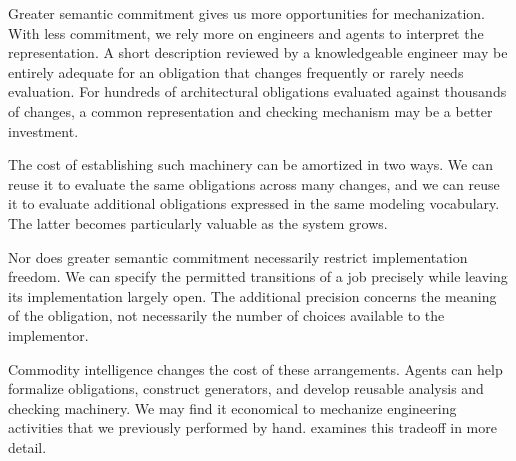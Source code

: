 Greater semantic commitment gives us more opportunities for mechanization. With less commitment, we rely more on engineers and agents to interpret the representation. A short description reviewed by a knowledgeable engineer may be entirely adequate for an obligation that changes frequently or rarely needs evaluation. For hundreds of architectural obligations evaluated against thousands of changes, a common representation and checking mechanism may be a better investment.

The cost of establishing such machinery can be amortized in two ways. We can reuse it to evaluate the same obligations across many changes, and we can reuse it to evaluate additional obligations expressed in the same modeling vocabulary. The latter becomes particularly valuable as the system grows.

Nor does greater semantic commitment necessarily restrict implementation freedom. We can specify the permitted transitions of a job precisely while leaving its implementation largely open. The additional precision concerns the meaning of the obligation, not necessarily the number of choices available to the implementor.

Commodity intelligence changes the cost of these arrangements. Agents can help formalize obligations, construct generators, and develop reusable analysis and checking machinery. We may find it economical to mechanize engineering activities that we previously performed by hand.  examines this tradeoff in more detail.

